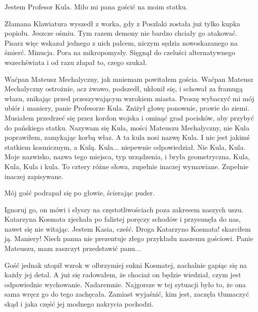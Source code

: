 \begin{dialogue}
\ds{} Jestem Profesor Kula. Miło mi pana gościć na moim statku.
\end{dialogue}

\divider{}

Złamana Klawiatura wyszedł z worka, gdy z Poszlaki została już tylko kupka popiołu.
Jeszcze ośmiu.
Tym razem demony nie bardzo chciały go atakować.
Pisarz więc wskazał jednego z nich palcem, niczym sędzia nowoskazanego na śmierć.
Minucja. Pora na mikropomysły. 
Sięgnął do czeluści alternatywnego wszechświata i od razu złapał to, czego szukał.

\divider{}

\begin{dialogue}
\ds{} Waćpan Mateusz Mechalyczny, jak mniemam \dm{} powitałem gościa. Waćpan Mateusz Mechalyczny ostrożnie, acz żwawo, podszedł, ukłonił się, i schował za framugą włazu,
znikając przed przeszywającym wzrokiem miasta.
\ds{} Proszę wybaczyć mi mój ubiór i maniery, panie Profesorze Kula. \dm{} Zniżył głowę ponownie, prawie do ziemi. \dm{}
Musiałem przedrzeć się przez kordon wojska i ominąć grad pocisków, aby przybyć do pańskiego statku.
\ds{} Nazywam się Kula, mości Mateuszu Mechalyczny, nie Kula \dm{} poprawiłem, zamykając korbą właz. \dm{} A ta kula nosi nazwę Kula. 
I nie jest jakimś statkiem kosmicznym, a Kulą.
\ds{} Kula... \dm{} niepewnie odpowiedział.
\ds{} Nie Kula, Kula. Moje nazwisko, nazwa tego miejsca, typ urządzenia, i bryła geometryczna. Kula, Kula, Kula i kula. To cztery różne słowa, zupełnie inaczej wymawiane.
Zupełnie inaczej zapisywane.
\end{dialogue}

Mój gość podrapał się po głowie, ścierając puder.

\begin{dialogue}
\ds{} Ignoruj go, on mówi i słyszy na częstotliwościach poza zakresem naszych uszu. \dm{} Katarzyna Kosmata zjechała po falistej poręczy schodów i przysunęła do nas, nawet się nie witając.
\dm{} Jestem Kasia, cześć.
\ds{} Droga Katarzyno Kosmata! \dm{} skarciłem ją. \dm{} Maniery! Niech panna nie prezentuje złego przykładu naszemu gościowi. Panie Mateuszu, mam zaszczyt przedstawić panu...
\end{dialogue}

Gość jednak utopił wzrok w olbrzymiej sukni Kosmatej, nachalnie gapiąc się na każdy jej detal.
A już się radowałem, że chociaż on będzie wiedział, czym jest odpowiednie wychowanie. Nadaremnie.
Najgorsze w tej sytuacji było to, że ona sama wręcz go do tego zachęcała. 
Zamiast wyjaśnić, kim jest, zaczęła tłumaczyć skąd i jaka część jej modnego nakrycia pochodzi.

